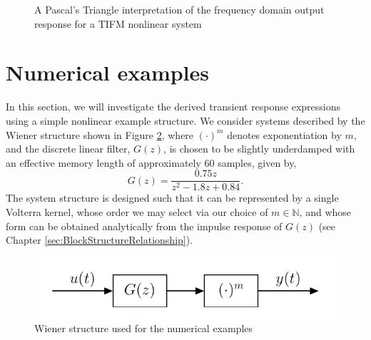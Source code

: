 \begin{figure}[h]

\caption{A Pascal's Triangle interpretation of the frequency domain output response for a TIFM nonlinear system}
\label{fig:NonlinearPascalTriangle}
\end{figure}

\section{Numerical examples}
\label{sec:NumEx_Transients}

In this section, we will investigate the derived transient response expressions using a simple nonlinear example structure. We consider systems described by the Wiener structure shown in Figure \ref{fig:WienerStructure_Transients}, where $(\cdot)^m$ denotes exponentiation by $m$, and the discrete linear filter, $G(z)$, is chosen to be slightly underdamped with an effective memory length of approximately 60 samples, given by,
\begin{equation}
G(z) = \frac{0.75z}{z^2 -1.8z + 0.84}.
\end{equation}
The system structure is designed such that it can be represented by a single Volterra kernel, whose order we may select via our choice of $m \in \mathbb{N}$, and whose form can be obtained analytically from the impulse response of $G(z)$ (see Chapter \ref{sec:BlockStructureRelationship}).

\begin{figure}[h]
\centering
\includegraphics[scale = 0.8]{Chapter9_NonlinTransients/Wiener_Transients.pdf}
\caption{Wiener structure used for the numerical examples}
\label{fig:WienerStructure_Transients}
\end{figure}

